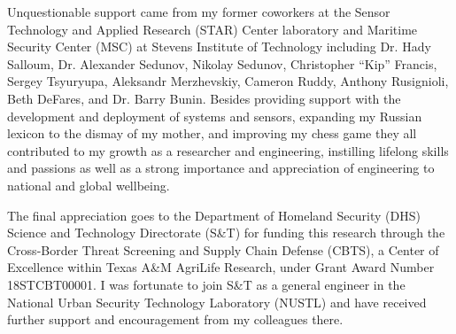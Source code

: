 \documentclass[11pt]{report}
\begin{document}
Unquestionable support came from my former coworkers at the Sensor Technology and Applied Research (STAR) Center laboratory and Maritime Security Center (MSC) at Stevens Institute of Technology including Dr. Hady Salloum, Dr. Alexander Sedunov, Nikolay Sedunov, Christopher ``Kip'' Francis, Sergey Tsyuryupa, Aleksandr Merzhevskiy, Cameron Ruddy, Anthony Rusignioli, Beth DeFares, and Dr. Barry Bunin. Besides providing support with the development and deployment of systems and sensors, expanding my Russian lexicon to the dismay of my mother, and improving my chess game they all contributed to my growth as a researcher and engineering, instilling lifelong skills and passions as well as a strong importance and appreciation of engineering to national and global wellbeing.

The final appreciation goes to the Department of Homeland Security (DHS) Science and Technology Directorate (S\&T) for funding this research through the Cross-Border Threat Screening and Supply Chain Defense (CBTS), a Center of Excellence within Texas A\&M AgriLife Research, under Grant Award Number 18STCBT00001. I was fortunate to join S\&T as a general engineer in the National Urban Security Technology Laboratory (NUSTL) and have received further support and encouragement from my colleagues there. 




\end{document}
